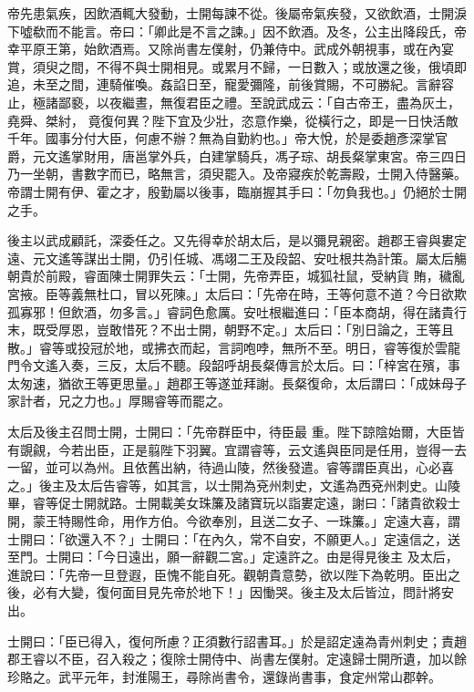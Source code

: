 \begin{pinyinscope}
 帝先患氣疾，因飲酒輒大發動，士開每諫不從。後屬帝氣疾發，又欲飲酒，士開淚下噓欷而不能言。帝曰：「卿此是不言之諫。」因不飲酒。及冬，公主出降段氏，帝幸平原王第，始飲酒焉。又除尚書左僕射，仍兼侍中。武成外朝視事，或在內宴賞，須臾之間，不得不與士開相見。或累月不歸，一日數入；或放還之後，俄頃即追，未至之間，連騎催喚。姦諂日至，寵愛彌隆，前後賞賜，不可勝紀。言辭容止，極諸鄙褻，以夜繼晝，無復君臣之禮。至說武成云：「自古帝王，盡為灰土，堯舜、桀紂，
 竟復何異？陛下宜及少壯，恣意作樂，從橫行之，即是一日快活敵千年。國事分付大臣，何慮不辦？無為自勤約也。」帝大悅，於是委趙彥深掌官爵，元文遙掌財用，唐邕掌外兵，白建掌騎兵，馮子琮、胡長粲掌東宮。帝三四日乃一坐朝，書數字而已，略無言，須臾罷入。及帝寢疾於乾壽殿，士開入侍醫藥。帝謂士開有伊、霍之才，殷勤屬以後事，臨崩握其手曰：「勿負我也。」仍絕於士開之手。



 後主以武成顧託，深委任之。又先得幸於胡太后，是以彌見親密。趙郡王睿與婁定遠、元文遙等謀出士開，仍引任城、馮翊二王及段韶、安吐根共為計策。屬太后觴朝貴於前殿，睿面陳士開罪失云：「士開，先帝弄臣，城狐社鼠，受納貨
 賄，穢亂宮掖。臣等義無杜口，冒以死陳。」太后曰：「先帝在時，王等何意不道？今日欲欺孤寡邪！但飲酒，勿多言。」睿詞色愈厲。安吐根繼進曰：「臣本商胡，得在諸貴行末，既受厚恩，豈敢惜死？不出士開，朝野不定。」太后曰：「別日論之，王等且散。」睿等或投冠於地，或拂衣而起，言詞咆哱，無所不至。明日，睿等復於雲龍門令文遙入奏，三反，太后不聽。段韶呼胡長粲傳言於太后。曰：「梓宮在殯，事太匆速，猶欲王等更思量。」趙郡王等遂並拜謝。長粲復命，太后謂曰：「成妹母子家計者，兄之力也。」厚賜睿等而罷之。



 太后及後主召問士開，士開曰：「先帝群臣中，待臣最
 重。陛下諒陰始爾，大臣皆有覬覦，今若出臣，正是翦陛下羽翼。宜謂睿等，云文遙與臣同是任用，豈得一去一留，並可以為州。且依舊出納，待過山陵，然後發遣。睿等謂臣真出，心必喜之。」後主及太后告睿等，如其言，以士開為兗州刺史，文遙為西兗州刺史。山陵畢，睿等促士開就路。士開載美女珠簾及諸寶玩以詣婁定遠，謝曰：「諸貴欲殺士開，蒙王特賜性命，用作方伯。今欲奉別，且送二女子、一珠簾。」定遠大喜，謂士開曰：「欲還入不？」士開曰：「在內久，常不自安，不願更人。」定遠信之，送至門。士開曰：「今日遠出，願一辭觀二宮。」定遠許之。由是得見後主
 及太后，進說曰：「先帝一旦登遐，臣愧不能自死。觀朝貴意勢，欲以陛下為乾明。臣出之後，必有大變，復何面目見先帝於地下！」因慟哭。後主及太后皆泣，問計將安出。



 士開曰：「臣已得入，復何所慮？正須數行詔書耳。」於是詔定遠為青州刺史；責趙郡王睿以不臣，召入殺之；復除士開侍中、尚書左僕射。定遠歸士開所遺，加以餘珍賂之。武平元年，封淮陽王，尋除尚書令，還錄尚書事，食定州常山郡幹。




\end{pinyinscope}
